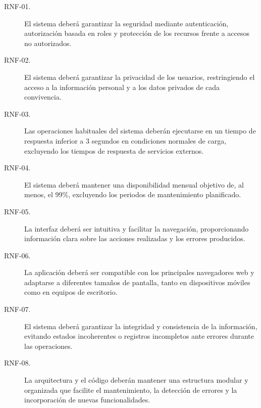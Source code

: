 \begin{description}

    \item[RNF-01.] El sistema deberá garantizar la seguridad mediante autenticación, autorización basada en roles y protección de los recursos frente a accesos no autorizados.

    \item[RNF-02.] El sistema deberá garantizar la privacidad de los usuarios, restringiendo el acceso a la información personal y a los datos privados de cada convivencia.

    \item[RNF-03.] Las operaciones habituales del sistema deberán ejecutarse en un tiempo de respuesta inferior a 3 segundos en condiciones normales de carga, excluyendo los tiempos de respuesta de servicios externos.

    \item[RNF-04.] El sistema deberá mantener una disponibilidad mensual objetivo de, al menos, el 99\%, excluyendo los periodos de mantenimiento planificado.

    \item[RNF-05.] La interfaz deberá ser intuitiva y facilitar la navegación, proporcionando información clara sobre las acciones realizadas y los errores producidos.

    \item[RNF-06.] La aplicación deberá ser compatible con los principales navegadores web y adaptarse a diferentes tamaños de pantalla, tanto en dispositivos móviles como en equipos de escritorio.

    \item[RNF-07.] El sistema deberá garantizar la integridad y consistencia de la información, evitando estados incoherentes o registros incompletos ante errores durante las operaciones.

    \item[RNF-08.] La arquitectura y el código deberán mantener una estructura modular y organizada que facilite el mantenimiento, la detección de errores y la incorporación de nuevas funcionalidades.

\end{description}
